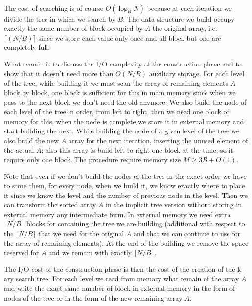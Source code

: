 \documentclass[a4paper]{article}
\newcommand\ceil[1]{\lceil#1\rceil}
\begin{document}
\


The cost of searching is of course $O(\log_{B} N)$ because at each iteration we divide the tree in which we search by $B$.
The data structure we build occupy exactly the same number of block occupied by $A$ the original array, i.e. $\ceil{(N/B)}$ since we store each value only once and all block but one are completely full.

What remain is to discuss the I/O complexity of the construction phase and to show that it doesn't need more than $O(N/B)$ auxiliary storage.
For each level of the tree, while building it we must scan the array of remaining elements $A$ block by block, one block is sufficient for this in main memory since when we pass to the next block we don't need the old anymore.
We also build the node of each level of the tree in order, from left to right, then we need one block of memory for this, when the node is complete we store it in external memory and start building the next.
While building the node of a given level of the tree we also build the new $A$ array for the next iteration, inserting the unused element of the actual $A$; also this array is build left to right one block at the time, so it require only one block.
The procedure require memory size $M \geq 3B + O(1)$.

Note that even if we don't build the nodes of the tree in the exact order we have to store them, for every node, when we build it, we know exactly where to place it since we know the level and the number of previous node in the level.
Then we can transform the sorted array $A$ in the implicit tree version without storing in external memory any intermediate form.
In external memory we need extra $\ceil{N/B}$ blocks for containing the tree we are building (additional with respect to the $\ceil{N/B}$ that we need for the original $A$ and that we can continue to use for the array of remaining elements).
At the end of the building we remove the space reserved for $A$ and we remain with exactly $\ceil{N/B}$.


The I/O cost of the construction phase is then the cost of the creation of the k-ary search tree.
For each level we read from memory what remain of the array $A$ and write the exact same number of block in external memory in the form of nodes of the tree or in the form of the new remaining array $A$.
\end{document}
